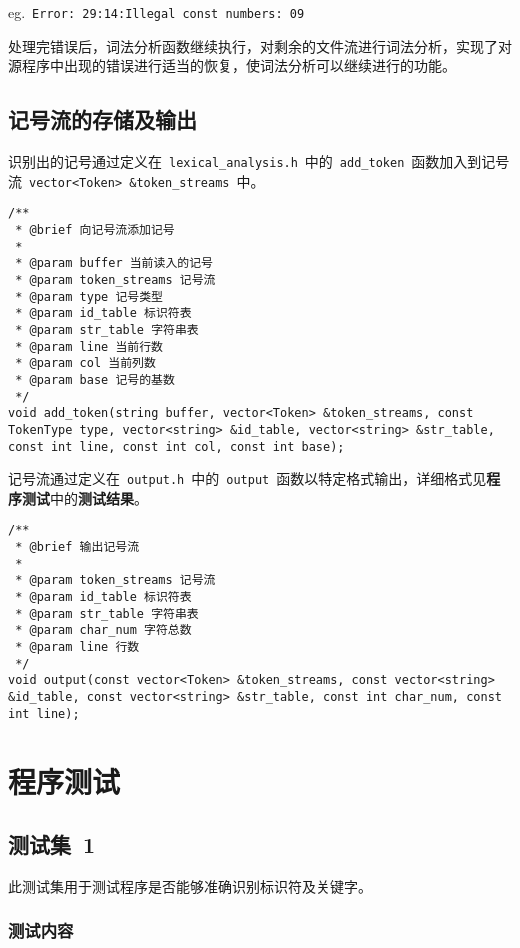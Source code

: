 \documentclass[lang=cn,11pt,a4paper]{paper}
\begin{document}
eg.\ \lstinline{Error: 29:14:Illegal const numbers: 09}

处理完错误后，词法分析函数继续执行，对剩余的文件流进行词法分析，实现了对源程序中出现的错误进行适当的恢复，使词法分析可以继续进行的功能。

\subsection{记号流的存储及输出}

识别出的记号通过定义在\ \lstinline{lexical_analysis.h}\ 中的\ \lstinline{add_token}\ 函数加入到记号流\ \lstinline{vector<Token> &token_streams}\ 中。

\begin{lstlisting}
/**
 * @brief 向记号流添加记号
 *
 * @param buffer 当前读入的记号
 * @param token_streams 记号流
 * @param type 记号类型
 * @param id_table 标识符表
 * @param str_table 字符串表
 * @param line 当前行数
 * @param col 当前列数
 * @param base 记号的基数
 */
void add_token(string buffer, vector<Token> &token_streams, const TokenType type, vector<string> &id_table, vector<string> &str_table, const int line, const int col, const int base);
\end{lstlisting}

记号流通过定义在\ \lstinline{output.h}\ 中的\ \lstinline{output}\ 函数以特定格式输出，详细格式见\textbf{程序测试}中的\textbf{测试结果}。

\begin{lstlisting}
/**
 * @brief 输出记号流
 * 
 * @param token_streams 记号流  
 * @param id_table 标识符表
 * @param str_table 字符串表
 * @param char_num 字符总数
 * @param line 行数
 */
void output(const vector<Token> &token_streams, const vector<string> &id_table, const vector<string> &str_table, const int char_num, const int line);

\end{lstlisting}

\section{程序测试}

\subsection{测试集\ 1}

此测试集用于测试程序是否能够准确识别标识符及关键字。

\subsubsection{测试内容}
\end{document}
